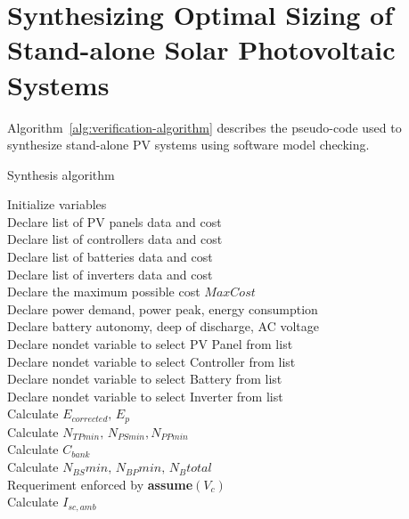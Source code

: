 \documentclass[10pt,conference]{IEEEtran}
\begin{document}
\section{Synthesizing Optimal Sizing of Stand-alone Solar Photovoltaic Systems}
Algorithm~\ref{alg:verification-algorithm} describes the pseudo-code used to synthesize stand-alone PV systems using software model checking. 
%
 \begin{algorithm}
 \caption{Synthesis algorithm}
 \begin{algorithmic}[1]
 \begin{scriptsize}
 
 \renewcommand{\algorithmicrequire}{\textbf{Input:}}
 \renewcommand{\algorithmicensure}{\textbf{Output:}}
  \STATE Initialize variables \\
  \STATE Declare list of PV panels data and cost \\
  \STATE Declare list of controllers data and cost \\
  \STATE Declare list of batteries data and cost \\
  \STATE Declare list of inverters data and cost \\
  \STATE Declare the maximum possible cost $MaxCost$  \\
  \STATE Declare power demand, power peak, energy consumption \\
  \STATE Declare battery autonomy, deep of discharge, AC voltage \\
 	\STATE Declare nondet variable to select PV Panel from list \\
 	\STATE Declare nondet variable to select Controller from list \\
 	\STATE Declare nondet variable to select Battery from list \\
 	\STATE Declare nondet variable to select Inverter from list \\ 	
 	\STATE Calculate $E_{corrected}, \, E_{p} $ \\
	\STATE Calculate $N_{TPmin}, \, N_{PSmin}, N_{PPmin} $ \\
 	\STATE Calculate $C_{bank}$ \\
	\STATE Calculate $N_{BS}min, \, N_{BP}min, \, N_{B}total$ \\
	\STATE Requeriment enforced by \textbf{assume}$(V_{c})$ \\
 	\STATE Calculate $I_{sc,amb}$ \\

\end{scriptsize}
\end{algorithmic}
\end{algorithm}
\end{document}
